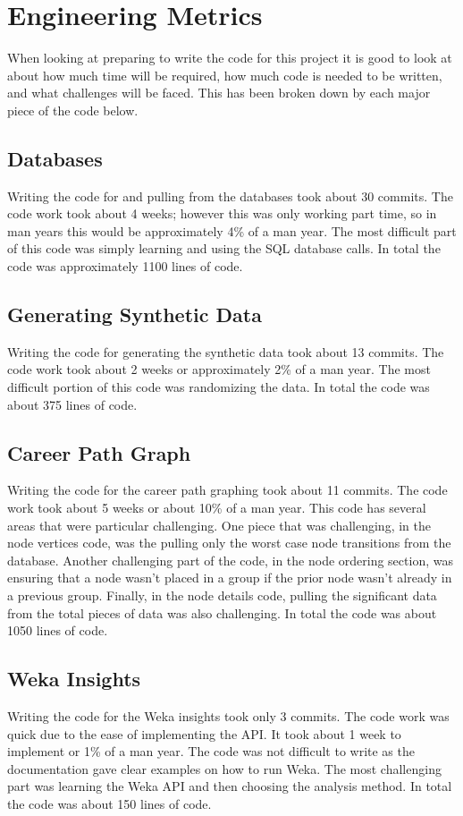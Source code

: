 \section{Engineering Metrics}
\label{sect:engineering-metrics}
When looking at preparing to write the code for this project it is good to look
at about how much time will be required, how much code is needed to be written,
and what challenges will be faced.  This has been broken down by each major
piece of the code below.
\subsection{Databases}
Writing the code for and pulling from the databases took about 30 commits.
The code work took about 4 weeks; however this was only working part time, so in
man years this would be approximately 4\% of a man year.  The most difficult
part of this code was simply learning and using the SQL database calls.  In
total the code was approximately 1100 lines of code.
\subsection{Generating Synthetic Data}
Writing the code for generating the synthetic data took about 13 commits.  The
code work took about 2 weeks or approximately 2\% of a man year.  The most difficult
portion of this code was randomizing the data.  In total the code was about 375
lines of code.
\subsection{Career Path Graph}
Writing the code for the career path graphing took about 11 commits.  The code
work took about 5 weeks or about 10\% of a man year.  This code has several
areas that were particular challenging.  One piece that was challenging, in the
node vertices code, was the pulling only the worst case node transitions from
the database.  Another challenging part of the code, in the node ordering
section, was ensuring that a node wasn't placed in a group if the prior node
wasn't already in a previous group.  Finally, in the node details code, pulling
the significant data from the total pieces of data was also challenging.  In
total the code was about 1050 lines of code.
\subsection{Weka Insights}
Writing the code for the Weka insights took only 3 commits.  The code work was
quick due to the ease of implementing the API.  It took about 1 week to
implement or 1\% of a man year.  The code was not difficult to write as the
documentation gave clear examples on how to run Weka.  The most challenging part
was learning the Weka API and then choosing the analysis method.  In total the
code was about 150 lines of code.
